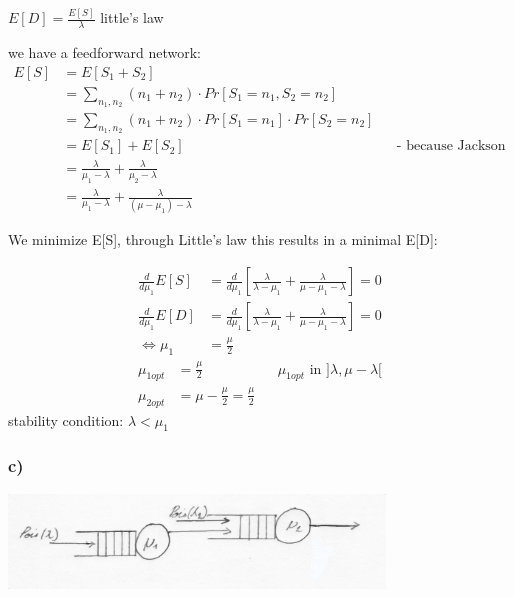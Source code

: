 $E\left[D\right]=\frac{E\left[S\right]}{\lambda }$ little's law

we have a feedforward network:
\begin{align*}
E\left[S\right]&=E\left[S_{1}+S_{2}\right]\\
&=\sum _{{n_{1},n_{2}}}\left(n_{1}+n_{2}\right)\cdot Pr\left[S_{1}=n_{1},S_{2}=n_{2}\right]\\
&=\sum _{{n_{1},n_{2}}}\left(n_{1}+n_{2}\right)\cdot Pr\left[S_{1}=n_{1}\right]\cdot Pr\left[S_{2}=n_{2}\right]\\
&=E\left[S_{1}\right]+E\left[S_{2}\right]&& \text{-  because Jackson Network -}\\
&=\frac{\lambda }{\mu _{1}-\lambda }+\frac{\lambda }{\mu _{2}-\lambda }\\
&=\frac{\lambda }{\mu _{1}-\lambda }+\frac{\lambda }{\left(\mu -\mu _{1}\right)-\lambda }
\end{align*}

We minimize E[S], through Little's law this results in a minimal E[D]:

\begin{align*}
\frac{d}{d\mu _{1}}E\left[S\right]&=\frac{d}{d\mu _{1}}\left[\frac{\lambda }{\lambda -\mu _{1}}+\frac{\lambda }{\mu -\mu _{1}-\lambda }\right]=0\\
\frac{d}{d\mu _{1}}E\left[D\right]&=\frac{d}{d\mu _{1}}\left[\frac{\lambda }{\lambda -\mu _{1}}+\frac{\lambda }{\mu -\mu _{1}-\lambda }\right]=0\\
\Leftrightarrow \mu _{1}&=\frac{\mu }{2}
\end{align*}
\begin{align*}
\mu _{{1opt}}&=\frac{\mu }{2} && \mu_{1opt} \text{ in } ] \lambda, \mu - \lambda[\\ 
\mu _{{2opt}}&=\mu -\frac{\mu }{2}=\frac{\mu }{2}
\end{align*}
stability condition: $\lambda < \mu _{1}$

\subsubsection*{c)}

\includegraphics[width=0.75\textwidth]{pics/Ex09_jackson_net_4c.jpg}

